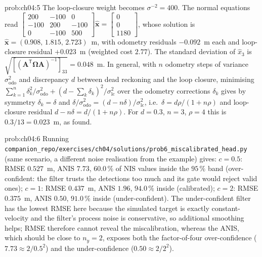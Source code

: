 \documentclass[graybox,envcountchap]{style/SNmono}
\newcommand{\repopath}[1]{\texttt{#1}}
\begin{document}
\begin{sol}{prob:ch04:5}
The loop-closure weight becomes $\sigma^{-2}=400$. The normal equations read
$\begin{bmatrix}200&-100&0\\-100&200&-100\\0&-100&500\end{bmatrix}\widehat{\mathbf{x}}=\begin{bmatrix}0\\0\\1180\end{bmatrix}$, whose solution is $\widehat{\mathbf{x}}=(0.908,\,1.815,\,2.723)$~m, with odometry residuals $-0.092$~m each and loop-closure residual $+0.023$~m (weighted cost $2.77$). The standard deviation of $\widehat{x}_3$ is $\sqrt{[(\mathbf{A}^{\mathsf T}\mathbf{\Omega}\mathbf{A})^{-1}]_{33}}=0.048$~m. In general, with $n$ odometry steps of variance $\sigma_{\mathrm{odo}}^{2}$ and discrepancy $d$ between dead reckoning and the loop closure, minimising $\sum_{k=1}^{n}\delta_k^{2}/\sigma_{\mathrm{odo}}^{2}+(d-\sum_k\delta_k)^{2}/\sigma_{\mathrm{lc}}^{2}$ over the odometry corrections $\delta_k$ gives by symmetry $\delta_k=\delta$ and $\delta/\sigma_{\mathrm{odo}}^{2}=(d-n\delta)/\sigma_{\mathrm{lc}}^{2}$, i.e.\ $\delta=d\rho/(1+n\rho)$ and loop-closure residual $d-n\delta=d/(1+n\rho)$. For $d=0.3$, $n=3$, $\rho=4$ this is $0.3/13=0.023$~m, as found.
\end{sol}
\begin{sol}{prob:ch04:6}
Running \repopath{companion\_\allowbreak repo/\allowbreak exercises/\allowbreak ch04/\allowbreak solutions/\allowbreak prob6\_\allowbreak miscalibrated\_\allowbreak head.py} (same scenario, a different noise realisation from the example) gives: $c=0.5$: RMSE $0.527$~m, ANIS $7.73$, $60.0\,\%$ of NIS values inside the $95\,\%$ band (over-confident: the filter trusts the detections too much and its gate would reject valid ones); $c=1$: RMSE $0.437$~m, ANIS $1.96$, $94.0\,\%$ inside (calibrated); $c=2$: RMSE $0.375$~m, ANIS $0.50$, $91.0\,\%$ inside (under-confident). The under-confident filter has the lowest RMSE here because the simulated target is exactly constant-velocity and the filter's process noise is conservative, so additional smoothing helps; RMSE therefore cannot reveal the miscalibration, whereas the ANIS, which should be close to $n_y=2$, exposes both the factor-of-four over-confidence ($7.73\approx 2/0.5^{2}$) and the under-confidence ($0.50\approx2/2^{2}$).
\end{sol}
\end{document}

